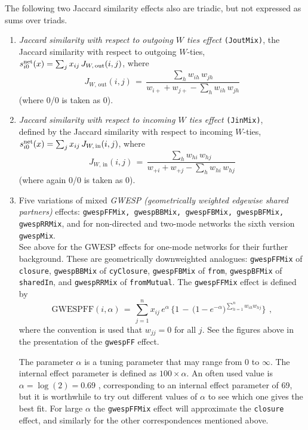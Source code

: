 \documentclass[a4paper,fleqn,11pt]{article}
\newcommand{\+}{\, + \,}
\newcommand{\vit}{\theenumi}
\newcounter{savenumi}
\begin{document}
\noindent The following two Jaccard similarity effects also are triadic,
 but not expressed as sums over triads.

\begin{enumerate}
\setcounter{enumi}{\value{savenumi}}
 \item {\em Jaccard similarity with respect to outgoing $W$ ties effect} \texttt{(JoutMix)},
 the Jaccard similarity with respect to outgoing $W$-ties,\\
 $s^{\rm net}_{i\vit}(x) =  \sum_j x_{ij} \, J_{W,\, \text{out}}(i,j)$, where
 \[
 J_{W,\, \text{out}}(i,j) \,=\, \frac{\sum_h w_{ih}\,w_{jh}}
                     {w_{i+} + w_{j+} - \sum_h w_{ih}\,w_{jh}}
 \]
 (where 0/0 is taken as 0).

 \item {\em Jaccard similarity with respect to incoming $W$ ties effect} \texttt{(JinMix)},\\
 defined by
 the Jaccard similarity with respect to incoming $W$-ties,\\
 $s^{\rm net}_{i\vit}(x) =  \sum_j x_{ij} \, J_{W,\, \text{in}}(i,j)$, where
 \[
 J_{W,\, \text{in}}(i,j) \,=\, \frac{\sum_h w_{hi}\,w_{hj}}
                     {w_{+i} + w_{+j} - \sum_h w_{hi}\,w_{hj}}
 \]
 (where again 0/0 is taken as 0).

 \item Five variations of mixed \emph{GWESP (geometrically weighted edgewise
  shared partners)} effects: \texttt{gwespFFMix, gwespBBMix,
  gwespFBMix, gwespBFMix, gwespRRMix}, and for non-directed
  and two-mode networks the sixth version \texttt{gwespMix}. \\
  See above for the GWESP effects for one-mode networks for their
  further background.
  These are geometrically downweighted analogues:
   \texttt{gwespFFMix} of \texttt{closure},
   \texttt{gwespBBMix} of \texttt{cyClosure},
  \texttt{gwespFBMix} of \texttt{from}, \texttt{gwespBFMix} of \texttt{sharedIn},
  and \texttt{gwespRRMix} of \texttt{fromMutual}.
  The \texttt{gwespFFMix} effect is defined by
\[
  \text{GWESPFF}(i, \alpha) \,=\,
       \sum_{j=1}^n x_{ij} \,
                        e^{\alpha} \,\Big\{1 \,-\, \big(1 -
                        e^{-\alpha}\big)^{\sum_{h=1}^n w_{ih}w_{hj} }  \Big\}
      \,   \ ,
\]
where the convention is used that $w_{jj} = 0$ for all $j$.
See the figures above in the presentation of the \texttt{gwespFF}
effect.

The parameter $\alpha$ is a tuning parameter that may range from 0 to $\infty$.
The internal effect parameter is defined as $100 \times \alpha$.
An often used value is $\alpha = \log(2) = 0.69$ \citep{SPRH06},
corresponding to an internal effect parameter of 69,
but it is worthwhile to try out different values of $\alpha$
to see which one gives the best fit.
For large $\alpha$ the  \texttt{gwespFFMix} effect will
approximate the \texttt{closure} effect, and similarly for the
other correspondences mentioned above.


\end{enumerate}
\end{document}
